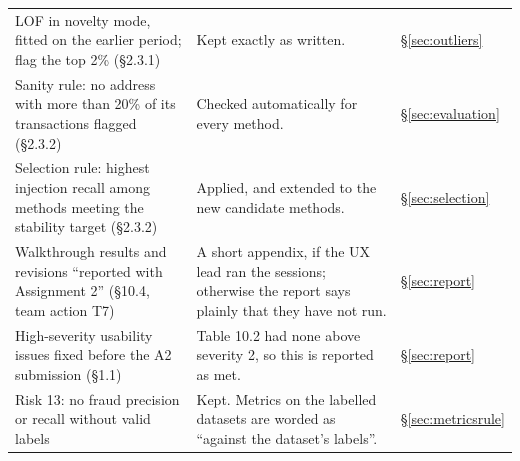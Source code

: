 \begin{longtable}{@{}L{4.6cm}L{6.4cm}L{3.6cm}@{}}
LOF in novelty mode, fitted on the earlier period; flag the top 2\% (§2.3.1) & Kept exactly as written. & \S\ref{sec:outliers} \\
Sanity rule: no address with more than 20\% of its transactions flagged (§2.3.2) & Checked automatically for every method. & \S\ref{sec:evaluation} \\
Selection rule: highest injection recall among methods meeting the stability target (§2.3.2) & Applied, and extended to the new candidate methods. & \S\ref{sec:selection} \\
Walkthrough results and revisions ``reported with Assignment 2'' (§10.4, team action T7) & A short appendix, if the UX lead ran the sessions; otherwise the report says plainly that they have not run. & \S\ref{sec:report} \\
High-severity usability issues fixed before the A2 submission (§1.1) & Table 10.2 had none above severity 2, so this is reported as met. & \S\ref{sec:report} \\
Risk 13: no fraud precision or recall without valid labels & Kept. Metrics on the labelled datasets are worded as ``against the dataset's labels''. & \S\ref{sec:metricsrule} \\
\bottomrule
\end{longtable}
